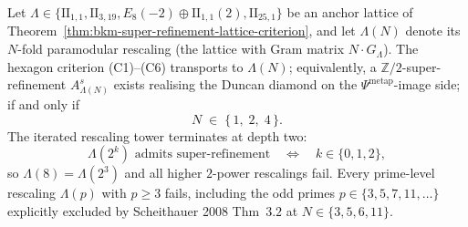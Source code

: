 \begin{theorem}
\label{thm:bkm-super-refinement-rescaling-completeness}
Let $\Lambda\in\{\mathrm{II}_{1,1},\mathrm{II}_{3,19},
E_8(-2)\oplus\mathrm{II}_{1,1}(2),\mathrm{II}_{25,1}\}$ be an anchor
lattice of
Theorem~\ref{thm:bkm-super-refinement-lattice-criterion}, and let
$\Lambda(N)$ denote its $N$-fold paramodular rescaling
(the lattice with Gram matrix $N\cdot G_\Lambda$). The hexagon
criterion (C1)--(C6) transports to $\Lambda(N)$; equivalently, a
$\mathbb{Z}/2$-super-refinement
$A^s_{\Lambda(N)}$ exists realising the Duncan diamond on the
$\Psi^{\mathrm{metap}}$-image side; if and only if
\[
 N \;\in\; \{\,1,\;2,\;4\,\}.
\]
The iterated rescaling tower terminates at depth two:
\[
 \Lambda(2^k) \text{ admits super-refinement}
 \quad\Longleftrightarrow\quad
 k \in \{0,1,2\},
\]
so $\Lambda(8) = \Lambda(2^3)$ and all higher $2$-power rescalings
fail. Every prime-level rescaling $\Lambda(p)$ with $p\ge 3$ fails,
including the odd primes $p\in\{3,5,7,11,\ldots\}$ explicitly
excluded by Scheithauer 2008 Thm~$3.2$ at $N\in\{3,5,6,11\}$.
\end{theorem}

